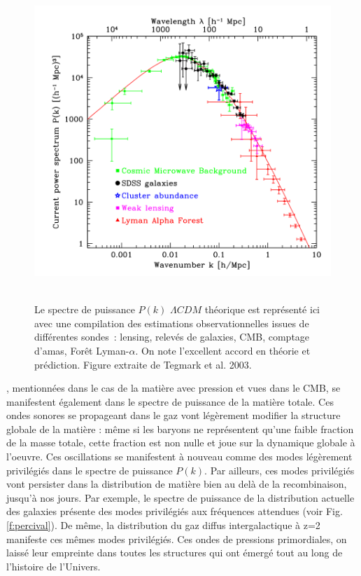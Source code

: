 \begin{figure}[htbp]
	\centering
		\includegraphics[height=12cm]{figs/pstegmark.png}
		\caption[Le spectre de puissance observé]{Le spectre de puissance $P(k)$ $\Lambda CDM$ théorique est représenté ici avec une compilation des estimations observationnelles issues de différentes sondes~: lensing, relevés de galaxies, CMB, comptage d'amas, Forêt Lyman-$\alpha$. On note l'excellent accord en théorie et prédiction.  Figure extraite de Tegmark et al. 2003. }
	\label{f:pktegmark}
\end{figure}


, mentionnées dans le cas de la matière avec pression et vues dans le CMB, se manifestent également dans le spectre de puissance de la matière totale. Ces ondes sonores se propageant dans le gaz vont légèrement modifier la structure globale de la matière : même si les baryons ne représentent qu'une faible fraction de la masse totale, cette fraction est non nulle et joue sur la dynamique globale à l'oeuvre. Ces oscillations se manifestent à nouveau comme des modes légèrement privilégiés dans le spectre de puissance $P(k)$. Par ailleurs, ces modes privilégiés vont persister dans la distribution de matière bien au delà de la recombinaison, jusqu'à nos jours. Par exemple, le spectre de puissance de la distribution actuelle des galaxies  présente des modes privilégiés aux fréquences attendues (voir Fig. \ref{f:percival}). De même, la distribution du gaz diffus intergalactique à z=2 manifeste ces mêmes modes privilégiés. Ces ondes de pressions primordiales, on laissé leur empreinte dans toutes les structures qui ont émergé tout au long de l'histoire de l'Univers.

